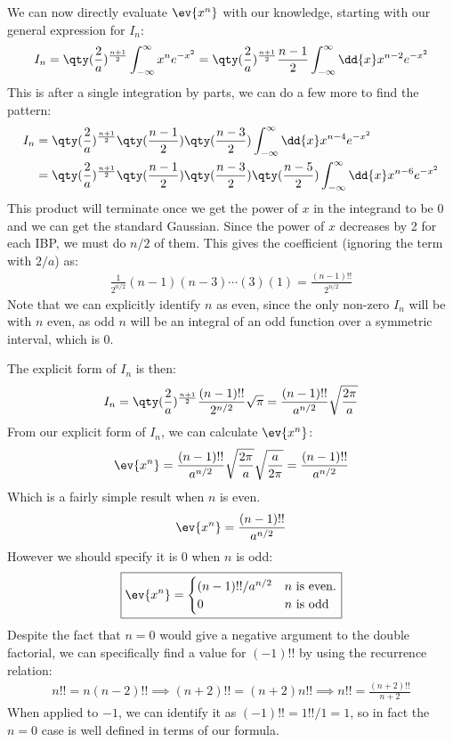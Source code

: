 \documentclass[12pt]{article}
\begin{document}
We can now directly evaluate $\ev{x^n}$ with our knowledge, starting with our general expression for $I_n$:
\begin{align*}
  I_n=\qty(\frac2a)^{\frac{n+1}2}\int^\infty_{-\infty}x^ne^{-x^2}
  =\qty(\frac2a)^{\frac{n+1}2}\frac{n-1}{2}\int_{-\infty}^\infty\dd{x}x^{n-2}e^{-x^2}
\end{align*}
This is after a single integration by parts, we can do a few more to find the pattern:
\begin{align*}
  I_n&=\qty(\frac2a)^{\frac{n+1}2}\qty(\frac{n-1}{2})\qty(\frac{n-3}{2})
  \int_{-\infty}^\infty\dd{x}x^{n-4}e^{-x^2}\\
  &=\qty(\frac2a)^{\frac{n+1}2}\qty(\frac{n-1}2)\qty(\frac{n-3}2)\qty(\frac{n-5}2)
  \int_{-\infty}^\infty\dd{x}x^{n-6}e^{-x^2}
\end{align*}
This product will terminate once we get the power of $x$ in the integrand to be 0 and we can get the standard Gaussian. Since the power of $x$ decreases by 2 for each IBP, we must do $n/2$ of them. This gives the coefficient (ignoring the term with $2/a$) as:
\begin{align*}
  \frac1{2^{n/2}}(n-1)(n-3)\cdots(3)(1)=\frac{(n-1)!!}{2^{n/2}}
\end{align*}
Note that we can explicitly identify $n$ as even, since the only non-zero $I_n$ will be with $n$ even, as odd $n$ will be an integral of an odd function over a symmetric interval, which is 0.

The explicit form of $I_n$ is then:
\begin{align*}
  I_n=\qty(\frac2a)^{\frac{n+1}2}\frac{(n-1)!!}{2^{n/2}}\sqrt{\pi}
  =\frac{(n-1)!!}{a^{n/2}}\sqrt{\frac{2\pi}{a}}
\end{align*}
From our explicit form of $I_n$, we can calculate $\ev{x^n}$:
\begin{align*}
  \ev{x^n}=\frac{(n-1)!!}{a^{n/2}}\sqrt{\frac{2\pi}{a}}\sqrt{\frac{a}{2\pi}}=\frac{(n-1)!!}{a^{n/2}}
\end{align*}
Which is a fairly simple result when $n$ is even.
\begin{align*}
  \ev{x^n}=\frac{(n-1)!!}{a^{n/2}}
\end{align*}
However we should specify it is 0 when $n$ is odd:
\begin{align}
  \boxed{\ev{x^n}=
    \begin{cases}
      (n-1)!!/a^{n/2} & \text{$n$ is even.} \\
      0 & \text{$n$ is odd}
    \end{cases}}
\end{align}
Despite the fact that $n=0$ would give a negative argument to the double factorial, we can specifically find a value for $(-1)!!$ by using the recurrence relation:
\begin{align*}
  n!!=n(n-2)!!\implies (n+2)!!=(n+2)n!!\implies n!!=\frac{(n+2)!!}{n+2}
\end{align*}
When applied to $-1$, we can identify it as $(-1)!!=1!!/1=1$, so in fact the $n=0$ case is well defined in terms of our formula. 
\end{document}
